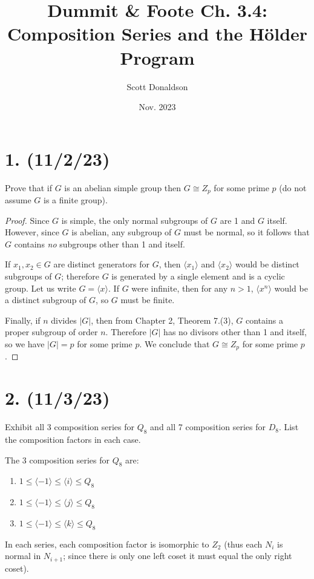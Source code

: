 \documentclass{article}
\title{Dummit \& Foote Ch. 3.4: Composition Series and the Hölder Program}
\author{Scott Donaldson}
\date{Nov. 2023}
\begin{document}
\maketitle

\section*{1. (11/2/23)}

Prove that if $G$ is an abelian simple group then $G \cong Z_p$ for some prime $p$ (do not assume $G$ is a finite group).

\begin{proof}
    Since $G$ is simple, the only normal subgroups of $G$ are 1 and $G$ itself. However, since $G$ is abelian, any subgroup of $G$ must be normal, so it follows that $G$ contains \emph{no} subgroups other than 1 and itself.

    If $x_1, x_2 \in G$ are distinct generators for $G$, then $\langle x_1 \rangle$ and $\langle x_2 \rangle$ would be distinct subgroups of $G$; therefore $G$ is generated by a single element and is a cyclic group. Let us write $G = \langle x \rangle$. If $G$ were infinite, then for any $n > 1$, $\langle x^n \rangle$ would be a distinct subgroup of $G$, so $G$ must be finite.

    Finally, if $n$ divides $|G|$, then from Chapter 2, Theorem 7.(3), $G$ contains a proper subgroup of order $n$. Therefore $|G|$ has no divisors other than 1 and itself, so we have $|G| = p$ for some prime $p$. We conclude that $G \cong Z_p$ for some prime $p$.
\end{proof}

\section*{2. (11/3/23)}

Exhibit all 3 composition series for $Q_8$ and all 7 composition series for $D_8$. List the composition factors in each case.

The 3 composition series for $Q_8$ are:
\begin{enumerate}[itemsep=0em]
    \item $1 \leq \langle -1 \rangle \leq \langle i \rangle \leq Q_8$
    \item $1 \leq \langle -1 \rangle \leq \langle j \rangle \leq Q_8$
    \item $1 \leq \langle -1 \rangle \leq \langle k \rangle \leq Q_8$
\end{enumerate}
In each series, each composition factor is isomorphic to $Z_2$ (thus each $N_i$ is normal in $N_{i + 1}$; since there is only one left coset it must equal the only right coset).
\end{document}
